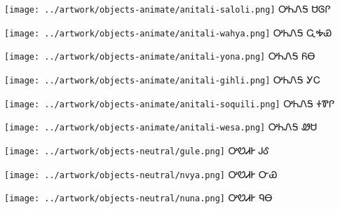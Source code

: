 \documentclass[avery5371]{flashcards}%
\begin{document}
\begin{flashcard}{
\texttt{[image: ../artwork/objects-animate/anitali-saloli.png]}
}\Huge ᎤᏂᏁᎦ ᏌᎶᎵ
\end{flashcard}

\begin{flashcard}{
\texttt{[image: ../artwork/objects-animate/anitali-wahya.png]}
}\Huge ᎤᏂᏁᎦ ᏩᎭᏯ
\end{flashcard}

\begin{flashcard}{
\texttt{[image: ../artwork/objects-animate/anitali-yona.png]}
}\Huge ᎤᏂᏁᎦ ᏲᎾ
\end{flashcard}

\begin{flashcard}{
\texttt{[image: ../artwork/objects-animate/anitali-gihli.png]}
}\Huge ᎤᏂᏁᎦ ᎩᏟ
\end{flashcard}

\begin{flashcard}{
\texttt{[image: ../artwork/objects-animate/anitali-soquili.png]}
}\Huge ᎤᏂᏁᎦ ᏐᏈᎵ
\end{flashcard}

\begin{flashcard}{
\texttt{[image: ../artwork/objects-animate/anitali-wesa.png]}
}\Huge ᎤᏂᏁᎦ ᏪᏌ
\end{flashcard}


\begin{flashcard}{
\texttt{[image: ../artwork/objects-neutral/gule.png]}
}\Huge ᎤᏬᏗᎨ ᎫᎴ
\end{flashcard}

\begin{flashcard}{
\texttt{[image: ../artwork/objects-neutral/nvya.png]}
}\Huge ᎤᏬᏗᎨ ᏅᏯ
\end{flashcard}

\begin{flashcard}{
\texttt{[image: ../artwork/objects-neutral/nuna.png]}
}\Huge ᎤᏬᏗᎨ ᏄᎾ
\end{flashcard}
\end{document}
